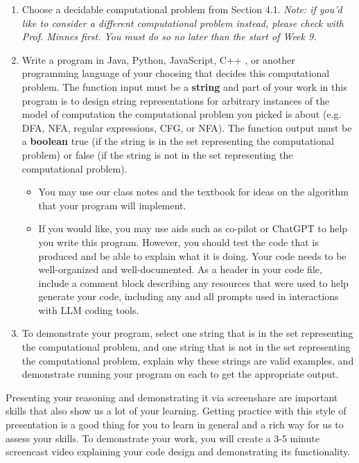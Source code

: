 \documentclass[12pt, oneside]{article}
\begin{document}
\begin{enumerate}
\item Choose a decidable computational problem from Section 4.1. 
{\it Note:
if you'd like to consider a different computational problem instead, please check with Prof. Minnes first. You must do so no later than the start of Week 9.}
\item Write a program in Java, Python, JavaScript, C++ , or another programming language of your choosing that decides this computational problem.  The function input must be a {\bf string} and part of your work in this program 
is to design string representations for arbitrary instances of the model of 
computation the computational problem you picked is about (e.g. DFA, NFA, regular expressions, CFG, or NFA). The function output must be a {\bf boolean} 
true (if the string is in the set representing the computational problem) or 
false (if the string is not in the set representing the computational problem).
\begin{itemize}
   \item You may use our class notes and the textbook for ideas on the algorithm that your program will implement.
   \item If you would like, you may use aids such as co-pilot or ChatGPT to help you write this program. 
   However, you should test the code that is produced and be able to explain what it is doing. Your code needs to be well-organized and well-documented.
   As a header in your code file, include a comment block describing any resources that were used to 
   help generate your code, including any and all prompts used in interactions 
   with LLM coding tools.
\end{itemize}

\item To demonstrate your program, select one string that is in the 
set representing the computational problem, and one string that is not in the 
set representing the computational problem, explain why these strings are valid
examples, and demonstrate running your program on each to get the appropriate 
output.
\end{enumerate}

Presenting your reasoning and demonstrating it via screenshare are important 
skills that also  show us a lot of your learning. Getting practice with this 
style of presentation is a good thing  for you to learn in general and a rich 
way for us to assess your skills. 
To demonstrate your work, you will create a 3-5 minute screencast video 
explaining your code design and demonstrating its functionality.
\end{document}
